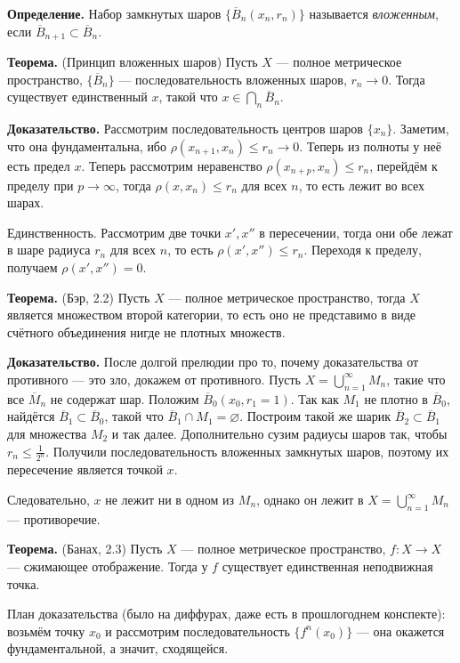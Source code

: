 \textbf{Определение.} Набор замкнутых шаров $\{\overline B_n(x_n, r_n)\}$ называется \textit{вложенным}, если $\overline B_{n+1} \subset \overline B_n$.

\textbf{Теорема.} (Принцип вложенных шаров) Пусть $X$ --- полное метрическое пространство, $\{\overline B_n\}$ --- последовательность вложенных шаров, $r_n \to 0$.
Тогда существует единственный $x$, такой что $x \in \bigcap_n \overline B_n$.

\textbf{Доказательство.} Рассмотрим последовательность центров шаров $\{x_n\}$.
Заметим, что она фундаментальна, ибо $\rho(x_{n+1}, x_n) \le r_n \to 0$.
Теперь из полноты у неё есть предел $x$.
Теперь рассмотрим неравенство $\rho(x_{n+p}, x_n) \le r_n$, перейдём к пределу при $p \to \infty$, тогда $\rho(x, x_n) \le r_n$ для всех $n$, то есть лежит во всех шарах.

Единственность. Рассмотрим две точки $x', x''$ в пересечении, тогда они обе лежат в шаре радиуса $r_n$ для всех $n$, то есть $\rho(x', x'') \le r_n$.
Переходя к пределу, получаем $\rho(x', x'') = 0$.

\QED

\textbf{Теорема.} (Бэр, 2.2) Пусть $X$ --- полное метрическое пространство, тогда $X$ является множеством второй категории, то есть оно не представимо в виде счётного объединения нигде не плотных множеств.

\textbf{Доказательство.} После долгой прелюдии про то, почему доказательства от противного --- это зло, докажем от противного.
Пусть $X = \bigcup_{n=1}^\infty M_n$, такие что все $\overline M_n$ не содержат шар.
Положим $\overline B_0(x_0, r_1 = 1)$.
Так как $M_1$ не плотно в $\overline B_0$, найдётся $\overline B_1 \subset \overline B_0$, такой что $\overline B_1 \cap M_1 = \varnothing$.
Построим такой же шарик $\overline B_2 \subset \overline B_1$ для множества $M_2$ и так далее.
Дополнительно сузим радиусы шаров так, чтобы $r_n \le \frac{1}{2^n}$.
Получили последовательность вложенных замкнутых шаров, поэтому их пересечение является точкой $x$.

Следовательно, $x$ не лежит ни в одном из $M_n$, однако он лежит в $X = \bigcup_{n=1}^\infty M_n$ --- противоречие.

\QED

\textbf{Теорема.} (Банах, 2.3) Пусть $X$ --- полное метрическое пространство, $f: X \to X$ --- сжимающее отображение.
Тогда у $f$ существует единственная неподвижная точка.

План доказательства (было на диффурах, даже есть в прошлогоднем конспекте): возьмём точку $x_0$ и рассмотрим последовательность $\{f^n(x_0)\}$ --- она окажется фундаментальной, а значит, сходящейся.

